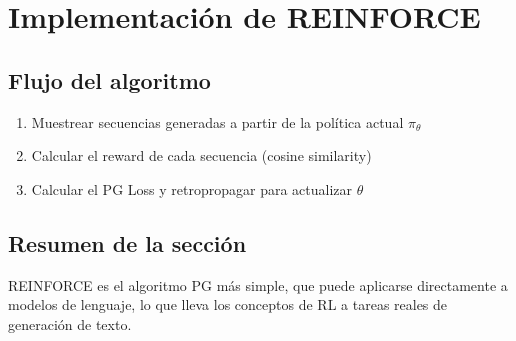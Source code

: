 \section{Implementación de REINFORCE}
\subsection{Flujo del algoritmo}
\begin{enumerate}
  \item Muestrear secuencias generadas a partir de la política actual $\pi_\theta$
  \item Calcular el reward de cada secuencia (cosine similarity)
  \item Calcular el PG Loss y retropropagar para actualizar $\theta$
\end{enumerate}

\subsection{Resumen de la sección}
REINFORCE es el algoritmo PG más simple, que puede aplicarse directamente a modelos de lenguaje, lo que lleva los conceptos de RL a tareas reales de generación de texto.

